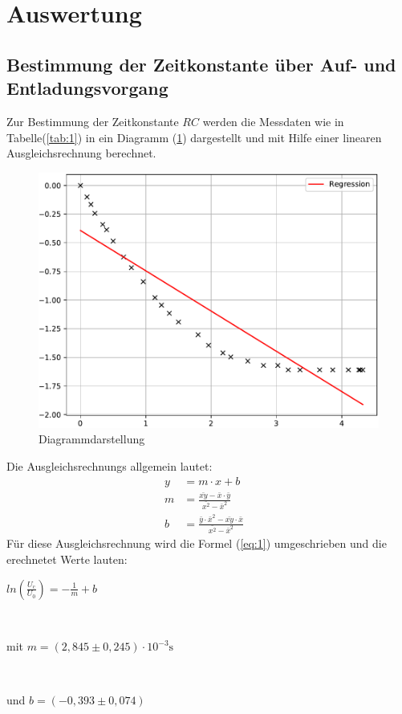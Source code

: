 

\section{Auswertung}
\subsection{Bestimmung der Zeitkonstante über Auf- und Entladungsvorgang}
Zur Bestimmung der Zeitkonstante $RC$ werden die Messdaten wie in Tabelle(\ref{tab:1})
in ein Diagramm (\ref{fig:1}) dargestellt und mit Hilfe einer linearen Ausgleichsrechnung
berechnet.

\begin{figure}[H]
  \centering
  \includegraphics[width=\textwidth]{Diagramm1.pdf}
  \caption{Diagrammdarstellung}
  \label{fig:1}
\end{figure}
Die Ausgleichsrechnungs allgemein lautet:
\begin{align}
  y & = m \cdot x + b \label{eq:}\\
  m & = \frac {\bar{xy} - \bar{x} \cdot \bar{y}} {\bar{x^2} -\bar{x}^2}&  \label{eq:}\\
  b & = \frac {\bar{y} \cdot \bar{x}^2 - \bar{xy} \cdot \bar{x}} {\bar{x^2}-\bar{x}^2}& \label{eq:}
\end{align}
Für diese Ausgleichsrechnung wird die Formel (\ref{eq:1}) umgeschrieben und die erechnetet Werte lauten: \\
\newline
\centerline{$ln(\frac{U_\text{c}}{U_\text{0}}) = -\frac{1}{m} + b$}\\
\newline
\centerline{mit $m = (2,845 \pm 0,245) \cdot 10^{-3} \si{\second}$}\\
\newline
\centerline{und $b = (-0,393 \pm 0,074)$}
\newline
